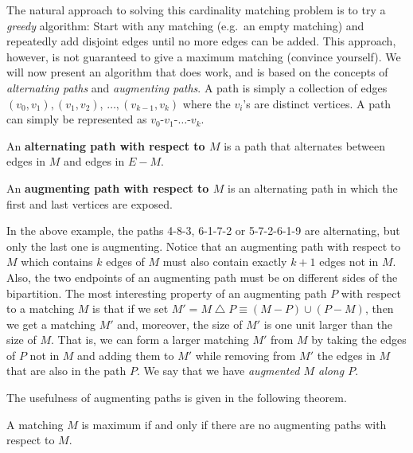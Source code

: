 \documentclass[12pt]{article}
\begin{document}
The natural approach to solving this cardinality matching problem is
to try a {\it greedy} algorithm: Start with any matching (e.g.\ an
empty matching) and repeatedly add disjoint edges until no more edges
can be added.  This approach, however, is not guaranteed to give a
maximum matching (convince yourself).  We will now present an
algorithm that does work, and is based on the concepts of {\it
alternating paths} and {\it augmenting paths}. A path is simply a
collection of edges $(v_0,v_1), (v_1, v_2)$, $\ldots, (v_{k-1},v_k)$
where the $v_i$'s are distinct vertices. A path can simply be
represented as $v_0$-$v_1$-$\ldots$-$v_k$.

\begin{definition}
An {\bf alternating path with respect to $M$} is a path that
alternates between edges in $M$ and edges in $E - M$.
\end{definition}

\begin{definition}
An {\bf augmenting path with respect to $M$} is an alternating path
in which the first and last vertices are exposed.
\end{definition}

In the above example, the paths 4-8-3, 6-1-7-2 or 5-7-2-6-1-9 are
alternating, but only the last one is augmenting. Notice that an
augmenting path with respect to $M$ which contains $k$ edges of $M$
must also contain exactly $k+1$ edges not in $M$. Also, the two
endpoints of an augmenting path must be on different sides of the
bipartition.  The most interesting property of an augmenting path $P$
with respect to a matching $M$ is that if we set $M' = M
\bigtriangleup P \equiv (M - P)
\cup (P - M)$, then we get a matching $M'$ and, moreover, the
size of $M'$ is one unit larger than the size of $M$.  That is, we can
form a larger matching $M'$ from $M$ by taking the edges of $P$ not in
$M$ and adding them to $M'$ while removing from $M'$ the edges in $M$
that are also in the path $P$. We say that we have {\it augmented $M$
along $P$}.

The usefulness of augmenting paths is given in the following theorem.
\begin{theorem}
A matching $M$ is maximum if and only if there are no augmenting paths
with respect to $M$.
\end{theorem}
\end{document}
